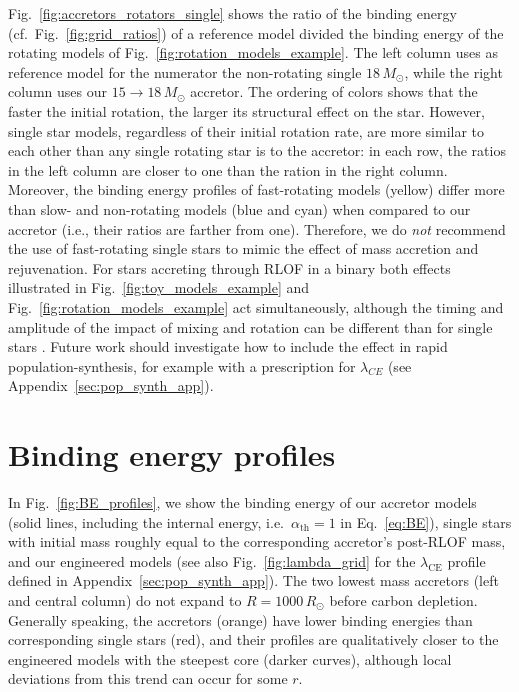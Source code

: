 \documentclass[twocolumn,twocolappendix,trackchanges]{aastex63}
\DeclareRobustCommand{\Eqref}[1]{Eq.~\ref{#1}}
\DeclareRobustCommand{\Figref}[1]{Fig.~\ref{#1}}
\begin{document}
\Figref{fig:accretors_rotators_single} shows the
  ratio of the binding energy (cf.~\Figref{fig:grid_ratios}) of a
  reference model divided the binding energy of the rotating models of
  \Figref{fig:rotation_models_example}. The left column uses as
  reference model for the numerator the non-rotating single
  $18\,M_\odot$, while the right column uses our
  $15\rightarrow18\,M_\odot$ accretor. The ordering of colors shows
  that the faster the initial rotation, the larger its structural
  effect on the star. However, single star models, regardless of their
  initial rotation rate, are more similar to each other than any
  single rotating star is to the accretor: in each row, the ratios in
  the left column are closer to one than the ration in the right
  column.  Moreover, the binding energy profiles of fast-rotating
  models (yellow) differ more than slow- and non-rotating models (blue
  and cyan) when compared to our accretor (i.e., their ratios are
  farther from one). Therefore, we do \emph{not} recommend the use of
  fast-rotating single stars to mimic the effect of mass accretion and
  rejuvenation.
For stars accreting through RLOF in a binary both
effects illustrated in \Figref{fig:toy_models_example} and
\Figref{fig:rotation_models_example} act simultaneously, although the
timing and amplitude of the impact of mixing and rotation can be
different than for single stars \citep[e.g.,][]{renzo:2021zoph}.
Future work should investigate how to include the
  effect in rapid population-synthesis, for example with
  a prescription for $\lambda_{CE}$ (see Appendix~\ref{sec:pop_synth_app}).

\section{Binding energy profiles}
\label{sec:BE}

In \Figref{fig:BE_profiles}, we show the binding energy of our
accretor models (solid lines,
including the internal energy, i.e.\ $\alpha_\mathrm{th}=1$ in
\Eqref{eq:BE}),
single stars with initial mass roughly equal
to the corresponding accretor's post-RLOF mass, and our engineered models (see also
\Figref{fig:lambda_grid} for the $\lambda_\mathrm{CE}$ profile defined in Appendix~\ref{sec:pop_synth_app}). The two
lowest mass accretors (left and central column) do not expand to
$R=1000\, R_\odot$ before carbon depletion. Generally speaking, the
accretors (orange) have lower binding energies than corresponding
single stars (red), and their profiles are qualitatively closer to the
engineered models with the steepest core (darker curves), although
local deviations from this trend can occur for some $r$.
\end{document}
